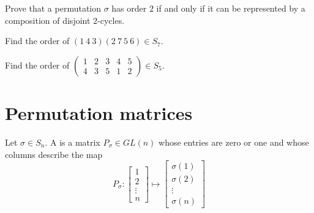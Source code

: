 \documentclass{ximera}
\begin{document}
\begin{exercise}
  Prove that a permutation $\sigma$ has order $2$ if and only if it
  can be represented by a composition of disjoint $2$-cycles.
\end{exercise}

\begin{exercise}
  Find the order of $(1\ 4\ 3)(2 \ 7 \ 5 \ 6) \in S_7$.
\end{exercise}

\begin{exercise}
  Find the order of $\left(\begin{smallmatrix}
    1 & 2 & 3 & 4 & 5\\
    4 & 3 & 5 & 1 & 2
  \end{smallmatrix}\right)\in S_5$.
\end{exercise}



\section{Permutation matrices}

\begin{definition}
  Let $\sigma \in S_n$. A  is a matrix
  $P_\sigma\in GL(n)$ whose entries are zero or one and whose columns
  describe the map
  \[
  P_\sigma : \begin{bmatrix}
    1 \\
    2 \\
    \vdots \\
    n
  \end{bmatrix}
  \mapsto
  \begin{bmatrix}
    \sigma(1) \\
    \sigma(2) \\
    \vdots \\
    \sigma(n)
  \end{bmatrix}
  \]
\end{definition}
\end{document}
